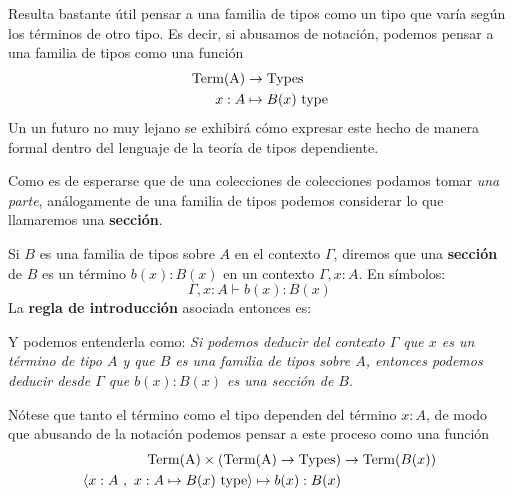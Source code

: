 \documentclass{article}
\begin{document}
        \begin{remark}
            Resulta bastante útil pensar a una familia de tipos como un tipo que varía según los términos de otro tipo. 
            Es decir, si abusamos de notación, podemos pensar a una familia de tipos como una función 
            \begin{align*}
                \mathrm{Term(A)} &\rightarrow \mathrm{Types}\\
                x : A &\mapsto B(x)\ \type
            \end{align*}
            Un un futuro no muy lejano se exhibirá cómo expresar este hecho de manera formal dentro del lenguaje de la teoría de tipos dependiente.
        \end{remark}

        Como es de esperarse que de una colecciones de colecciones podamos tomar \textit{una parte}, análogamente de una familia de tipos
        podemos considerar lo que llamaremos una \textbf{sección}.

        \begin{definition}
            Si $B$ es una familia de tipos sobre $A$ en el contexto $\Gamma$, diremos que una \textbf{sección} de $B$ es un término $b(x) : B(x)$ en un contexto
            $\Gamma, x : A$. En símbolos:
            $$
                \Gamma, x : A \vdash b(x) : B(x)
            $$
            La \textbf{regla de introducción} asociada entonces es:

            \begin{prooftree}
            \end{prooftree}
            Y podemos entenderla como:
            \textit{Si podemos deducir del contexto $\Gamma$ que $x$ es un término de tipo $A$ y que $B$ es una familia de tipos sobre $A$, 
            entonces podemos deducir desde $\Gamma$ que $b(x) : B(x)$ es una sección de $B$}.
        \end{definition}

        \begin{remark}
            Nótese que tanto el término como el tipo dependen del término $x : A$, de modo que abusando de la notación podemos pensar a este proceso como
            una función
            \begin{align*}
                \mathrm{Term(A)} \times (\mathrm{Term(A)} \rightarrow \mathrm{Types}) &\rightarrow \mathrm{Term}(B(x))\\
                \picopar{x : A\ ,\ x : A \mapsto B(x)\ \type}\mapsto b(x) : B(x)
            \end{align*}
        \end{remark}
        
\end{document}
